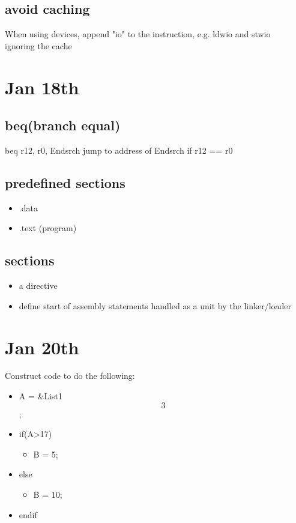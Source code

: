 \documentclass[11pt]{article}
\begin{document}
\subsection{avoid caching}
\label{sec:orgheadline12}
When using devices, append "io" to the instruction, e.g. ldwio and stwio \\
ignoring the cache
\section{Jan 18th}
\label{sec:orgheadline17}
\subsection{beq(branch equal)}
\label{sec:orgheadline14}
beq r12, r0, Endsrch
jump to address of Endsrch if r12 == r0
\subsection{predefined sections}
\label{sec:orgheadline15}
\begin{itemize}
\item .data
\item .text (program)
\end{itemize}
\subsection{sections}
\label{sec:orgheadline16}
\begin{itemize}
\item a directive
\item define start of assembly statements handled as a unit by the linker/loader
\end{itemize}
\section{Jan 20th}
\label{sec:orgheadline23}
Construct code to do the following:
\begin{itemize}
\item A = \&List1\[3\];
\item if(A>17)
\begin{itemize}
\item B = 5;
\end{itemize}
\item else
\begin{itemize}
\item B = 10;
\end{itemize}
\item endif
\end{itemize}
\end{document}
